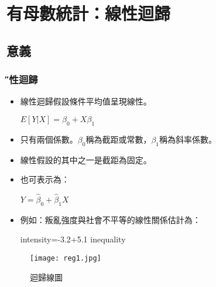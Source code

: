 \documentclass[xcolor=dvipsnames]{beamer}
\begin{document}
\section{有母數統計：線性迴歸}
\subsection{意義}
\begin{frame}\frametitle{\H 線性迴歸}
\begin{itemize}
\item 線性迴歸假設條件平均值呈現線性。
\begin{center}
$E[Y|X]=\beta_{0}+X\beta_{1}$
\end{center}
\item 只有兩個係數。$ \beta_{0} $稱為截距或常數，$ \beta_{1} $稱為斜率係數。
\item 線性假設的其中之一是截距為固定。
\item 也可表示為：
\begin{center}
$Y=\hat{\beta}_{0}+\hat{\beta}_{1} X  $\\
\end{center}
\item 例如：叛亂強度與社會不平等的線性關係估計為：
\begin{center}
intensity=-3.2+5.1 inequality
\end{center}
\end{itemize}
\end{frame}
\begin{frame}
\begin{figure}
\texttt{[image: reg1.jpg]} 
\caption{迴歸線圖}
\label{fig:fig1}
\end{figure}
\end{frame}
\end{document}
